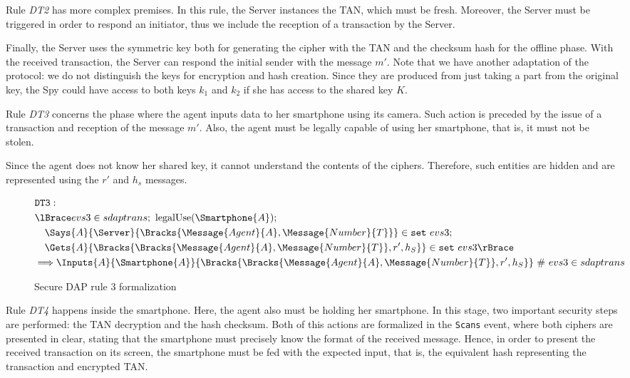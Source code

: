 Rule \textit{DT2} has more complex premises. In this rule, the Server instances the TAN, which must be fresh. Moreover, the Server must be triggered in order to respond an initiator, thus we include the reception of a transaction by the Server. 

Finally, the Server uses the symmetric key both for generating the cipher with the TAN and the checksum hash for the offline phase. With the received transaction, the Server can respond the initial sender with the message \(m'\). Note that we have another adaptation of the protocol: we do not distinguish the keys for encryption and hash creation. Since they are produced from just taking a part from the original key, the Spy could have access to both keys \(k_1\) and \(k_2\) if she has access to the shared key \(K\).

Rule \textit{DT3} concerns the phase where the agent inputs data to her smartphone using its camera. Such action is preceded by the issue of a transaction and reception of the message \(m'\). Also, the agent must be legally capable of using her smartphone, that is, it must not be stolen.

Since the agent does not know her shared key, it cannot understand the contents of the ciphers. Therefore, such entities are hidden and are represented using the \(r'\) and \(h_s\) messages.

\begin{figure}[h!]
  \begin{align*}
    & \texttt{DT3}: \newline \\
    & \lBrace evs3 \in sdaptrans;\ \text{legalUse}(\Smartphone{A}); \\
    & \quad \Says{A}{\Server}{\Bracks{\Message{Agent}{A}, \Message{Number}{T}}} \in \texttt{set} \ evs3; \\
    & \quad \Gets{A}{\Bracks{\Bracks{\Message{Agent}{A}, \Message{Number}{T}}, r', h_S}} \in \texttt{set} \ evs3 \rBrace \\
    & \Longrightarrow \Inputs{A}{\Smartphone{A}}{\Bracks{\Bracks{\Message{Agent}{A}, \Message{Number}{T}}, r', h_S}}   \ \# \ evs3 \in sdaptrans
  \end{align*}
  \label{fig:dap-model-3}
  \caption{Secure DAP rule 3 formalization}
\end{figure}

Rule \textit{DT4} happens inside the smartphone. Here, the agent also must be holding her smartphone. In this stage, two important security steps are performed: the TAN decryption and the hash checksum. Both of this actions are formalized in the \texttt{Scans} event, where both ciphers are presented in clear, stating that the smartphone must precisely know the format of the received message. Hence, in order to present the received transaction on its screen, the smartphone must be fed with the expected input, that is, the equivalent hash representing the transaction and encrypted TAN.

